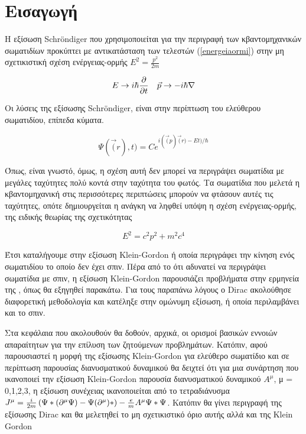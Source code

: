 \section{Εισαγωγή}

Η εξίσωση \textlatin{Schr\"ondiger} που χρησιμοποιείται για  την περιγραφή των κβαντομηχανικών σωματιδίων προκύπτει με αντικατάσταση των τελεστών (\ref{energeiaormi}) στην μη σχετικιστική σχέση ενέργειας-ορμής $E^2=\frac{p^2}{2m}$  

\begin{align} 
  E & \rightarrow i\hbar \frac{\partial }{\partial t}  &\vec{p} \rightarrow -i \hbar \nabla
  \label{energeiaormi}
\end{align} 

Οι λύσεις της εξίσωσης \textlatin{Schr\"ondiger}, είναι στην περίπτωση του ελεύθερου σωματιδίου, επίπεδα κύματα.

\[
  \Psi(\vec(r),t)=C e^{i(\vec(p)\vec(r)-Et)/\hbar}
\]

Όπως, είναι γνωστό, όμως, η σχέση αυτή δεν μπορεί να περιγράψει σωματίδια με μεγάλες ταχύτητες πολύ κοντά στην ταχύτητα του φωτός. Τα σωματίδια που μελετά η κβαντομηχανική στις περισσότερες περιπτώσεις μπορούν να φτάσουν αυτές τις ταχύτητες, οπότε δημιουργείται η ανάγκη να ληφθεί υπόψη η σχέση ενέργειας-ορμής, της ειδικής θεωρίας της σχετικότητας 

\begin{equation}
  E^2=c^2p^2+m^2c^4
  \label{genrel}
\end{equation} 

Έτσι καταλήγουμε στην εξίσωση \textlatin{Klein-Gordon} ή οποία περιγράφει την κίνηση ενός σωματιδίου το οποίο δεν έχει σπιν. Πέρα από το ότι αδυνατεί να περιγράψει σωματίδια με σπιν, η εξίσωση \textlatin{Klein-Gordon} παρουσιάζει προβλήματα στην ερμηνεία της , όπως θα εξηγηθεί παρακάτω. Για τους παραπάνω λόγους ο \textlatin{Dirac} ακολούθησε διαφορετική μεθοδολογία και κατέληξε στην ομώνυμη εξίσωση, ή οποία περιλαμβάνει και το σπιν. 


Στα κεφάλαια που ακολουθούν θα δοθούν, αρχικά, οι ορισμοί βασικών εννοιών απαραίτητων για την επίλυση των ζητούμενων προβλημάτων.
Κατόπιν, αφού παρουσιαστεί η μορφή της εξίσωσης \textlatin{Klein-Gordon} για ελεύθερο σωματίδιο και σε περίπτωση παρουσίας διανυσματικού δυναμικού θα δειχτεί ότι για μια συνάρτηση που ικανοποιεί την εξίσωση \textlatin{Klein-Gordon} παρουσία διανυσματικού δυναμικού $A^\mu$, μ = 0,1,2,3, η εξίσωση συνέχειας ικανοποιείται από το τετραδιάνυσμα $J^\mu =\frac{i}{2m} \left(  \Psi* (\partial^\mu \Psi)-\Psi(\partial^\mu)* \right)  - \frac{e}{m}A^\mu \Psi* \Psi$.
Κατόπιν θα γίνει περιγραφή της εξίσωσης \textlatin{Dirac} και θα μελετηθεί το μη σχετικιστικό όριο αυτής αλλά και της \textlatin{Klein Gordon}

